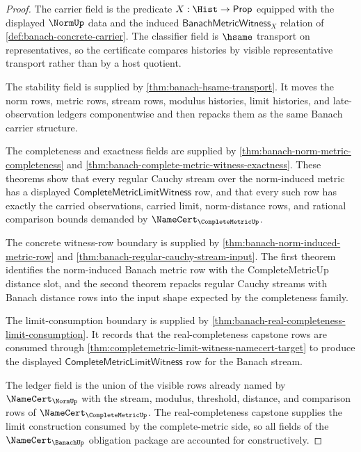 \begin{proof}
The carrier field is the predicate $X:\Hist\to\mathsf{Prop}$ equipped with
the displayed $\NormUp$ data and the induced
$\mathsf{BanachMetricWitness}_X$ relation of
\autoref{def:banach-concrete-carrier}. The classifier field is $\hsame$
transport on representatives, so the certificate compares histories by
visible representative transport rather than by a host quotient.

The stability field is supplied by
\autoref{thm:banach-hsame-transport}. It moves the norm rows, metric rows,
stream rows, modulus histories, limit histories, and late-observation ledgers
componentwise and then repacks them as the same Banach carrier structure.

The completeness and exactness fields are supplied by
\autoref{thm:banach-norm-metric-completeness} and
\autoref{thm:banach-complete-metric-witness-exactness}. These theorems show
that every regular Cauchy stream over the norm-induced metric has a displayed
$\mathsf{CompleteMetricLimitWitness}$ row, and that every such row has exactly
the carried observations, carried limit, norm-distance rows, and rational
comparison bounds demanded by $\NameCert_{\CompleteMetricUp}$.

The concrete witness-row boundary is supplied by
\autoref{thm:banach-norm-induced-metric-row} and
\autoref{thm:banach-regular-cauchy-stream-input}. The first theorem identifies
the norm-induced Banach metric row with the CompleteMetricUp distance slot,
and the second theorem repacks regular Cauchy streams with Banach distance
rows into the input shape expected by the completeness family.

The limit-consumption boundary is supplied by
\autoref{thm:banach-real-completeness-limit-consumption}. It records that the
real-completeness capstone rows are consumed through
\autoref{thm:completemetric-limit-witness-namecert-target} to produce the
displayed $\mathsf{CompleteMetricLimitWitness}$ row for the Banach stream.

The ledger field is the union of the visible rows already named by
$\NameCert_{\NormUp}$ with the stream, modulus, threshold, distance, and
comparison rows of $\NameCert_{\CompleteMetricUp}$. The real-completeness
capstone supplies the limit construction consumed by the complete-metric
side, so all fields of the $\NameCert_{\BanachUp}$ obligation package are
accounted for constructively.
\end{proof}


